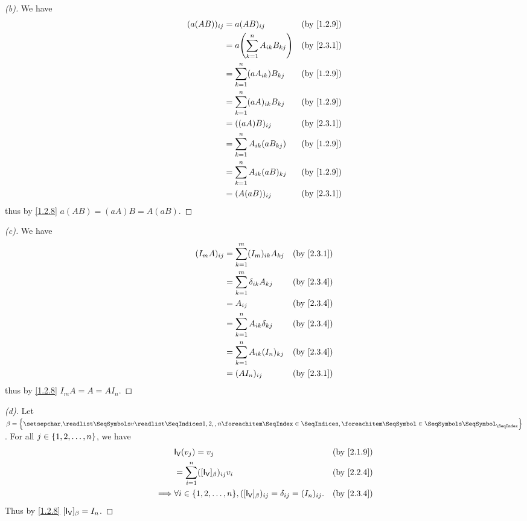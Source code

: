 \begin{proof}[(b)]
	We have
	\begin{align*}
		(a (AB))_{i j} & = a (AB)_{i j}                          &  & \by{1.2.9} \\
		               & = a \pa{\sum_{k = 1}^n A_{i k} B_{k j}} &  & \by{2.3.1} \\
		               & = \sum_{k = 1}^n (a A_{i k}) B_{k j}    &  & \by{1.2.9} \\
		               & = \sum_{k = 1}^n (a A)_{i k} B_{k j}    &  & \by{1.2.9} \\
		               & = ((aA) B)_{i j}                        &  & \by{2.3.1} \\
		               & = \sum_{k = 1}^n A_{i k} (a B_{k j})    &  & \by{1.2.9} \\
		               & = \sum_{k = 1}^n A_{i k} (a B)_{k j}    &  & \by{1.2.9} \\
		               & = (A (aB))_{i j}                        &  & \by{2.3.1}
	\end{align*}
	thus by \cref{1.2.8} \(a (AB) = (aA) B = A (aB)\).
\end{proof}

\begin{proof}[(c)]
	We have
	\begin{align*}
		(I_m A)_{i j} & = \sum_{k = 1}^m (I_m)_{i k} A_{k j}  &  & \by{2.3.1} \\
		              & = \sum_{k = 1}^m \delta_{i k} A_{k j} &  & \by{2.3.4} \\
		              & = A_{i j}                             &  & \by{2.3.4} \\
		              & = \sum_{k = 1}^n A_{i k} \delta_{k j} &  & \by{2.3.4} \\
		              & = \sum_{k = 1}^n A_{i k} (I_n)_{k j}  &  & \by{2.3.4} \\
		              & = (A I_n)_{i j}                       &  & \by{2.3.1}
	\end{align*}
	thus by \cref{1.2.8} \(I_m A = A = A I_n\).
\end{proof}

\begin{proof}[(d)]
	Let \(\beta = \set{\seq{v}{1,2,,n}}\).
	For all \(j \in \left\lbrace1, 2, \dots, n\right\rbrace\), we have
	\begin{align*}
		         & \IT[\V](v_j) = v_j                                                                          &  & \by{2.1.9} \\
		         & = \sum_{i = 1}^n ([\IT[\V]]_{\beta})_{i j} v_i                                              &  & \by{2.2.4} \\
		\implies & \forall i \in \set{1, 2, \dots, n}, ([\IT[\V]]_{\beta})_{i j} = \delta_{i j} = (I_n)_{i j}. &  & \by{2.3.4}
	\end{align*}
	Thus by \cref{1.2.8} \([\IT[\V]]_{\beta} = I_n\).
\end{proof}

